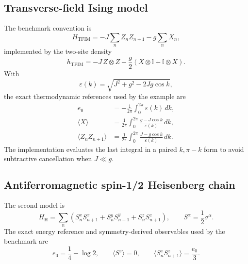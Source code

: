 \documentclass[11pt]{article}
\newcommand{\Id}{\mathbb{I}}
\begin{document}
\subsection{Transverse-field Ising model}

The benchmark convention is
\begin{equation}
  H_{\mathrm{TFIM}}
  =
  -J\sum_n Z_nZ_{n+1}
  -g\sum_n X_n,
  \label{eq:tfim-hamiltonian}
\end{equation}
implemented by the two-site density
\begin{equation}
  h_{\mathrm{TFIM}}
  =
  -J\,Z\otimes Z
  -\frac g2\left(X\otimes\Id+\Id\otimes X\right).
  \label{eq:tfim-bond-hamiltonian}
\end{equation}
With
\begin{equation}
  \varepsilon(k)
  =
  \sqrt{J^2+g^2-2Jg\cos k},
  \label{eq:tfim-dispersion-root}
\end{equation}
the exact thermodynamic references used by the example are
\begin{align}
  e_0
  &=
  -\frac{1}{2\pi}
  \int_0^{2\pi}\varepsilon(k)\,dk,
  \label{eq:tfim-exact-energy}\\
  \langle X\rangle
  &=
  \frac{1}{2\pi}
  \int_0^{2\pi}
  \frac{g-J\cos k}{\varepsilon(k)}\,dk,
  \label{eq:tfim-exact-x}\\
  \langle Z_nZ_{n+1}\rangle
  &=
  \frac{1}{2\pi}
  \int_0^{2\pi}
  \frac{J-g\cos k}{\varepsilon(k)}\,dk.
  \label{eq:tfim-exact-zz}
\end{align}
The implementation evaluates the last integral in a paired
$k,\pi-k$ form to avoid subtractive cancellation when $J\ll g$.

\subsection{Antiferromagnetic spin-1/2 Heisenberg chain}

The second model is
\begin{equation}
  H_{\mathrm H}
  =
  \sum_n\left(
    S_n^xS_{n+1}^x+
    S_n^yS_{n+1}^y+
    S_n^zS_{n+1}^z
  \right),
  \qquad S^\alpha=\frac12\sigma^\alpha.
  \label{eq:heisenberg-hamiltonian}
\end{equation}
The exact energy reference and symmetry-derived observables used by the
benchmark are
\begin{equation}
  e_0=\frac14-\log 2,
  \qquad
  \langle S^z\rangle=0,
  \qquad
  \langle S_n^zS_{n+1}^z\rangle=\frac{e_0}{3}.
  \label{eq:heisenberg-references}
\end{equation}
\end{document}
